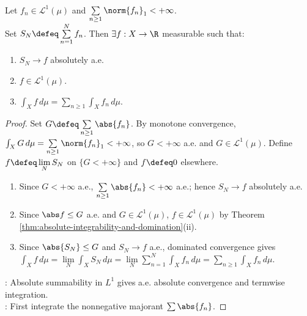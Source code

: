 \begin{theorem} \label{thm:l1-absolutely-summable-series-integrate-termwise} \\
Let $f_n\in\mathscr{L}^1(\mu)$ and $\sum\limits_{n\geq1}\norm{f_n}_1<+\infty$.\\
Set $S_N\defeq\sum\limits_{n=1}^{N}f_n$. Then $\exists f:X\to\R$ measurable such that:
\begin{enumerate}[label=(\roman*)]
\setlength{\itemsep}{0pt}
\item $S_N\to f$ absolutely a.e.
\item $f\in\mathscr{L}^1(\mu)$.
\item $\int_X f\,d\mu=\sum\limits_{n\geq1}\int_X f_n\,d\mu$.
\end{enumerate}
\begin{proof}
Set $G\defeq\sum\limits_{n\geq1}\abs{f_n}$. By monotone convergence, $\int_XG\,d\mu=\sum\limits_{n\geq1}\norm{f_n}_1<+\infty$, so $G<+\infty$ a.e. and $G\in\mathscr{L}^1(\mu)$. Define $f\defeq\lim\limits_NS_N$ on $\{G<+\infty\}$ and $f\defeq0$ elsewhere.
\begin{enumerate}[label=(\roman*)]
\setlength{\itemsep}{0pt}
\item Since $G<+\infty$ a.e., $\sum\limits_{n\geq1}\abs{f_n}<+\infty$ a.e.; hence $S_N\to f$ absolutely a.e.
\item Since $\abs f\leq G$ a.e. and $G\in\mathscr{L}^1(\mu)$, $f\in\mathscr{L}^1(\mu)$ by Theorem \ref{thm:absolute-integrability-and-domination}(ii).
\item Since $\abs{S_N}\leq G$ and $S_N\to f$ a.e., dominated convergence gives\\
$\int_Xf\,d\mu=\lim\limits_N\int_XS_N\,d\mu=\lim\limits_N\sum\limits_{n=1}^{N}\int_Xf_n\,d\mu=\sum\limits_{n\geq1}\int_Xf_n\,d\mu$.
\end{enumerate}
: Absolute summability in $L^1$ gives a.e. absolute convergence and termwise integration.\\
: First integrate the nonnegative majorant $\sum\abs{f_n}$.
\end{proof}
\end{theorem}

